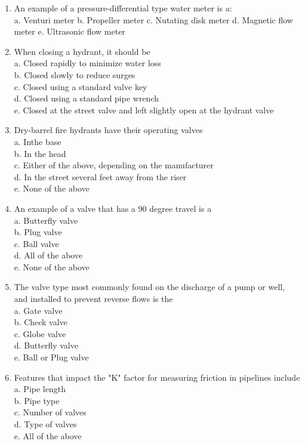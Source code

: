 \documentclass{article}
\begin{document}
\begin{enumerate}[1.]
\item An example of a pressure-differential type water meter is a:\\
a. Venturi meter
b. Propeller meter
c. Nutating disk meter
d. Magnetic flow meter
e. Ultrasonic flow meter

\item When closing a hydrant, it should be\\
a. Closed rapidly to minimize water loss\\
b. Closed slowly to reduce surges\\
c. Closed using a standard valve key\\
d. Closed using a standard pipe wrench\\
e. Closed at the street valve and left slightly open at the hydrant valve\\

\item Dry-barrel fire hydrants have their operating valves\\
a. Inthe base\\
b. In the head\\
c. Either of the above, depending on the manufacturer\\
d. In the street several feet away from the riser\\
e. None of the above\\

\item An example of a valve that has a 90 degree travel is a\\
a. Butterfly valve\\
b. Plug valve\\
c. Ball valve\\
d. All of the above\\
e. None of the above

\item The valve type most commonly found on the discharge of a pump or well, and installed to prevent reverse flows is the\\
a. Gate valve\\
b. Check valve\\
c. Globe valve\\
d. Butterfly valve\\
e. Ball or Plug valve\\


\item Features that impact the "K" factor for measuring friction in pipelines include\\
a. Pipe length\\
b. Pipe type\\
c. Number of valves\\
d. Type of valves\\
e. All of the above\\


\end{enumerate}
\end{document}

